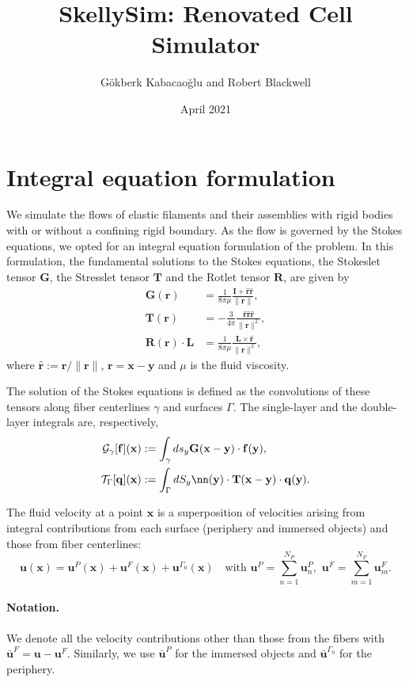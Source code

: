 \documentclass{article}
\title{SkellySim: Renovated Cell Simulator}
\author{G\"{o}kberk Kabacao\u{g}lu and Robert Blackwell}
\date{April 2021}
\newcommand{\uu}{\mathbf{u}}
\newcommand{\RR}{\mathbf{R}}
\newcommand{\TT}{\mathbf{T}}
\newcommand{\xx}{\mathbf{x}}
\newcommand{\yy}{\mathbf{y}}
\newcommand{\qq}{\mathbf{q}}
\newcommand{\rr}{\mathbf{r}}
\newcommand{\rrhat}{\hat{\mathbf{r}}}
\newcommand{\ubarF}{\bar{\mathbf{u}}^F}
\newcommand{\uF}{{\mathbf{u}}^F}
\newcommand{\ubarP}{\bar{\mathbf{u}}^P}
\newcommand{\ubarG}{\bar{\mathbf{u}}^{\Gamma_0}}
\newcommand{\ff}{\mathbf{f}}
\newcommand{\GG}{\mathbf{G}}
\newcommand{\calG}{\mathcal{G}}
\newcommand{\calT}{\mathcal{T}}
\newcommand{\II}{\mathbf{I}}
\newcommand{\LL}{\mathbf{L}}
\begin{document}
\maketitle

\section{Integral equation formulation}
We simulate the flows of elastic filaments and their assemblies with rigid bodies with or without a confining rigid boundary. As the flow is governed by the Stokes equations, we opted for an integral equation formulation of the problem. In this formulation, the fundamental solutions to the Stokes equations, the Stokeslet tensor $\GG$, the Stresslet tensor $\TT$ and the Rotlet tensor $\RR$, are given by
\begin{align}
    \GG(\rr) & = \frac{1}{8\pi \mu} \frac{\II + \rrhat\rrhat}{\| \rr \|}, \\
    \TT(\rr) & = -\frac{3}{4\pi}\frac{\rrhat \rrhat \rrhat}{\| \rr \|^2}, \\
    \RR(\rr)\cdot \LL & = \frac{1}{8 \pi \mu} \frac{\LL \times \rrhat}{\|\rr\|^2},
\end{align}
where $\rrhat := \rr / \|\rr\|$, $\rr = \xx - \yy$ and $\mu$ is the fluid viscosity.

The solution of the Stokes equations is defined as the convolutions of these tensors along fiber centerlines $\gamma$ and surfaces $\Gamma$. The single-layer and the double-layer integrals are, respectively,
\begin{align}
    \calG_{\gamma}[\ff](\xx) & := \int_{\gamma} ds_{y} \GG(\xx-\yy) \cdot \ff(\yy),\\
    \calT_{\Gamma}[\qq](\xx) & := \int_{\Gamma} dS_{y} \nn(\yy) \cdot \TT (\xx-\yy) \cdot \qq(\yy).
\end{align}

The fluid velocity at a point $\xx$ is a superposition of velocities arising from integral contributions from each surface (periphery and immersed objects) and those from fiber centerlines:
\begin{equation}
    \uu(\xx) = \uu^P(\xx) + \uu^F(\xx) + \uu^{\Gamma_0}(\xx) \quad \text{with} \,\, \uu^P = \sum_{n = 1}^{N_P} \uu_n^P, \,\, \uu^F = \sum_{m=1}^{N_F} \uu_m^F.
\end{equation}

\paragraph*{Notation.} We denote all the velocity contributions other than those from the fibers with $\ubarF = \uu - \uF$. Similarly, we use $\ubarP$ for the immersed objects and $\ubarG$ for the periphery.
\end{document}
